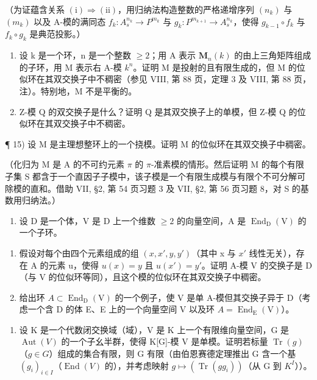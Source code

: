 （为证蕴含关系 \((\mathrm{i})\Rightarrow(\mathrm{ii})\)，用归纳法构造整数的严格递增序列 \((n_{k})\) 与 \((m_{k})\) 以及 A-模的满同态 \(f_{k}:A_{s}^{n_{k}}\to P^{m_{k}}\) 与 \(g_{k}:P^{m_{k+1}}\to A_{s}^{n_{k}}\)，使得 \(g_{k-1}\circ f_{k}\) 与 \(f_{k}\circ g_{k}\) 是典范投影。）

\begin{enumerate}
\def\labelenumi{\arabic{enumi})}
\setcounter{enumi}{12}
\item
  设 k 是一个环，n 是一个整数 \(\geqslant 2\)；用 A 表示 \(\mathbf{M}_{n}(k)\) 的由上三角矩阵组成的子环，用 M 表示右 A-模 \(k^{n}\)。证明 M 是投射的且有限生成的，但 M 的位似环在其双交换子中不稠密（参见 VIII, 第 88 页，定理 3 及 VIII, 第 88 页，注）。特别地，M 不是平衡的。
\item
  Z-模 Q 的双交换子是什么？证明 Q 是其双交换子上的单模，但 Z-模 Q 的位似环在其双交换子中不稠密。
\end{enumerate}

¶ 15) 设 M 是主理想整环上的一个挠模。证明 M 的位似环在其双交换子中稠密。

（化归为 M 是 A 的不可约元素 \(\pi\) 的 \(\pi\)-准素模的情形。然后证明 M 的每个有限子集 S 都含于一个直因子子模中，该子模是一个有限生成模与有限个不可分解可除模的直和。借助 VII, §2, 第 54 页习题 3 及 VII, §2, 第 56 页习题 8，对 S 的基数用归纳法。）

\begin{enumerate}
\def\labelenumi{\arabic{enumi})}
\setcounter{enumi}{15}
\tightlist
\item
  设 D 是一个体，V 是 D 上一个维数 \(\geqslant 2\) 的向量空间，A 是 \(\operatorname{End}_{\mathrm{D}}(\mathrm{V})\) 的一个子环。
\end{enumerate}

\begin{enumerate}
\def\labelenumi{\alph{enumi})}
\item
  假设对每个由四个元素组成的组 \((x, x', y, y')\)（其中 x 与 \(x'\) 线性无关），存在 A 的元素 u，使得 \(u(x) = y\) 且 \(u(x') = y'\)。证明 A-模 V 的交换子是 D（与 V 的位似环等同），且这个模的位似环在其双交换子中稠密。
\item
  给出环 \(A \subset \operatorname{End}_{\mathrm{D}}(\mathrm{V})\) 的一个例子，使 V 是单 A-模但其交换子异于 D（考虑一个含 D 的体 E、E 上的一个向量空间 V 以及环 \(A = \operatorname{End}_{\mathrm{E}}(\mathrm{V})\)）。
\end{enumerate}

\begin{enumerate}
\def\labelenumi{\arabic{enumi})}
\setcounter{enumi}{16}
\tightlist
\item
  设 K 是一个代数闭交换域（域），V 是 K 上一个有限维向量空间，G 是 \(\operatorname{Aut}(V)\) 的一个子幺半群，使得 K{[}G{]}-模 V 是单模。证明若标量 \(\operatorname{Tr}(g)\)（\(g \in G\)）组成的集合有限，则 G 有限（由伯恩赛德定理推出 G 含一个基 \((g_{i})_{i \in I}\)（\(\operatorname{End}(V)\) 的），并考虑映射 \(g \mapsto (\operatorname{Tr}(gg_{i}))\)（从 G 到 \(K^{I}\)））。
\end{enumerate}

